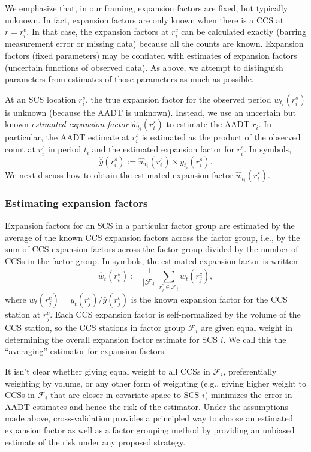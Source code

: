 \documentclass[11pt]{article}
\begin{document}
We emphasize that, in our framing, expansion factors are fixed, but
typically unknown. In fact, expansion factors are only known when there
is a CCS at \(r = r_i^c\). In that case, the expansion factors at
\(r_i^c\) can be calculated exactly (barring measurement error or
missing data) because all the counts are known. Expansion factors (fixed
parameters) may be conflated with estimates of expansion factors
(uncertain functions of observed data). As above, we attempt to
distinguish parameters from estimates of those parameters as much as
possible.

At an SCS location \(r_i^s\), the true expansion factor for the observed
period \({w}_{t_i}(r_i^s)\) is unknown (because the AADT is unknown).
Instead, we use an uncertain but known \emph{estimated expansion factor}
\(\hat{w}_{t_i}(r_i^s)\) to estimate the AADT \(r_i\). In particular,
the AADT estimate at \(r_i^s\) is estimated as the product of the
observed count at \(r_i^s\) in period \(t_i\) and the estimated
expansion factor for \(r_i^s\). In symbols,
\[\hat{\bar{y}}(r_i^s) := \hat{w}_{t_i}(r_i^s) \times y_{t_i}(r_i^s).\]
We next discuss how to obtain the estimated expansion factor
\(\hat{w}_{t_i}(r_i^s)\).

    \subsubsection{Estimating expansion
factors}\label{estimating-expansion-factors}

Expansion factors for an SCS in a particular factor group are estimated
by the average of the known CCS expansion factors across the factor
group, i.e., by the sum of CCS expansion factors across the factor group
divided by the number of CCSs in the factor group. In symbols, the
estimated expansion factor is written
\[\hat{w}_{t}(r_i^s) := \frac{1}{|\mathcal{F}_i|} \sum_{r_j^c \in \mathcal{F}_i} w_{t}(r_j^c),\]
where \(w_{t}(r_j^c) = y_{t}(r_j^c) / \bar{y}(r_j^c)\) is the known
expansion factor for the CCS station at \(r_j^c\). Each CCS expansion
factor is self-normalized by the volume of the CCS station, so the CCS
stations in factor group \(\mathcal{F}_i\) are given equal weight in
determining the overall expansion factor estimate for SCS \(i\). We call
this the ``averaging'' estimator for expansion factors.

It isn't clear whether giving equal weight to all CCSs in
\(\mathcal{F}_i\), preferentially weighting by volume, or any other form
of weighting (e.g., giving higher weight to CCSs in \(\mathcal{F}_i\)
that are closer in covariate space to SCS \(i\)) minimizes the error in
AADT estimates and hence the risk of the estimator. Under the
assumptions made above, cross-validation provides a principled way to
choose an estimated expansion factor as well as a factor grouping method
by providing an unbiased estimate of the risk under any proposed
strategy.
\end{document}
